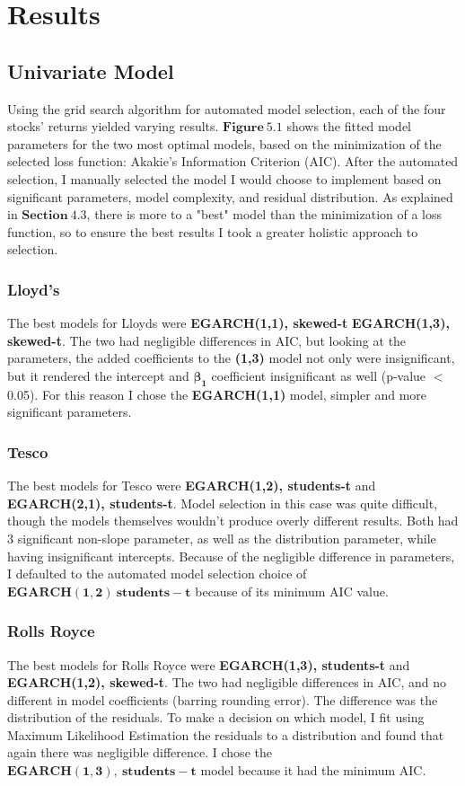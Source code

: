 \chapter{Results}
\label{ch:results}
\section{Univariate Model}
Using the grid search algorithm for automated model selection, each of the four stocks' returns yielded varying results. $\mathbf{Figure~5.1}$ shows the fitted model parameters for the two most optimal models, based on the minimization of the selected loss function: Akakie's Information Criterion (AIC). After the automated selection, I manually selected the model I would choose to implement based on significant parameters, model complexity, and residual distribution. As explained in $\mathbf{Section~4.3}$, there is more to a "best" model than the minimization of a loss function, so to ensure the best results I took a greater holistic approach to selection.

\subsection{Lloyd's}

The best models for Lloyds were \textbf{EGARCH(1,1), skewed-t}  \textbf{EGARCH(1,3),  skewed-t}. The two had negligible differences in AIC, but looking at the parameters, the added coefficients to the \textbf{(1,3)} model not only were insignificant, but it rendered the intercept and $\mathbf{\beta_1}$ coefficient insignificant as well (p-value $<$ 0.05). For this reason I chose the \textbf{EGARCH(1,1)} model, simpler and more significant parameters.

\subsection{Tesco}
The best models for Tesco were \textbf{EGARCH(1,2), students-t} and \textbf{EGARCH(2,1), students-t}. Model selection in this case was quite difficult, though the models themselves wouldn't produce overly different results. Both had 3 significant non-slope parameter, as well as the distribution parameter, while having insignificant intercepts. Because of the negligible difference in parameters, I defaulted to the automated model selection choice of  $\mathbf{EGARCH(1,2)~students-t}$ because of its minimum AIC value. 

\subsection{Rolls Royce}
The best models for Rolls Royce were \textbf{EGARCH(1,3), students-t} and \textbf{EGARCH(1,2), skewed-t}. The two had negligible differences in AIC, and no different in model coefficients (barring rounding error). The difference was the distribution of the residuals. To make a decision on which model, I fit using Maximum Likelihood Estimation the residuals to a distribution and found that again there was negligible difference. I chose the $\mathbf{EGARCH(1,3),~ students-t}$ model because it had the minimum AIC.  

